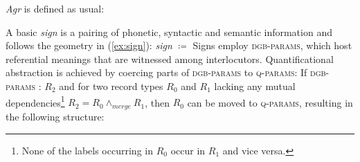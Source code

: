 \documentclass[output=paper,biblatex,babelshorthands,newtxmath,draftmode,colorlinks,citecolor=brown]{langscibook}
\begin{document}
\emph{Agr} is defined as usual:
%
\ea
{}
\z 



A basic \emph{sign} is a pairing of phonetic, syntactic and semantic information and follows the geometry in (\ref{ex:sign}): 
%
\ea \label{ex:sign}
\emph{sign} $\coloneqq$ 
\z
%
Signs employ \textsc{dgb-params}, which host referential meanings that are witnessed among interlocutors. 
%
Quantificational abstraction is achieved by coercing parts of \textsc{dgb-params} to \textsc{q-params}:
%
\ea
If \textsc{dgb-params} : $R_2$ and for two record types $R_0$ and $R_1$ lacking any mutual dependencies\footnote{None of the labels occurring in $R_0$ occur in $R_1$ and vice versa.}
$R_2 = R_0 \wedge_{merge} R_1$,
then $R_0$ can be moved to \textsc{q-params}, resulting in the following structure: \par\medskip 
 
\end{document}
